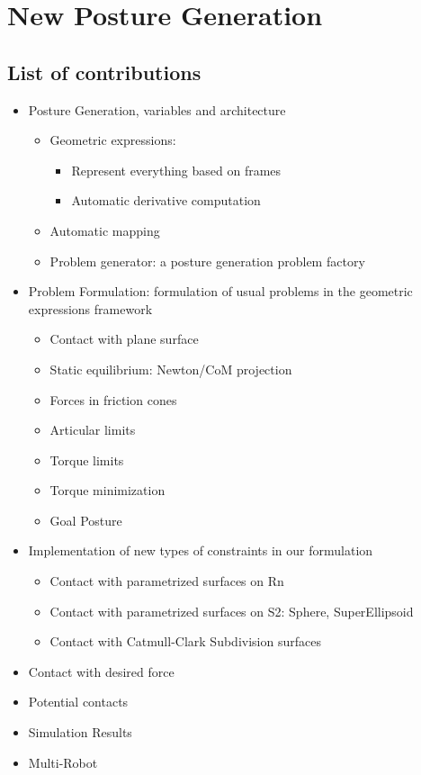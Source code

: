 

\chapter{
New Posture Generation
}

\section{List of contributions}
\begin{itemize}
  \item{Posture Generation, variables and architecture}
    \begin{itemize}
      \item Geometric expressions:
        \begin{itemize}
          \item Represent everything based on frames
          \item Automatic derivative computation
        \end{itemize}
      \item Automatic mapping
      \item Problem generator: a posture generation problem factory
    \end{itemize}
  \item{Problem Formulation: formulation of usual problems in the geometric expressions framework}
    \begin{itemize}
      \item Contact with plane surface
      \item Static equilibrium: Newton/CoM projection
      \item Forces in friction cones
      \item Articular limits
      \item Torque limits
      \item Torque minimization
      \item Goal Posture
    \end{itemize}
  \item{Implementation of new types of constraints in our formulation}
    \begin{itemize}
      \item Contact with parametrized surfaces on Rn
      \item Contact with parametrized surfaces on S2: Sphere, SuperEllipsoid
      \item Contact with Catmull-Clark Subdivision surfaces
    \end{itemize}
  \item{Contact with desired force}
  \item{Potential contacts}
  \item{Simulation Results}
  \item{Multi-Robot}
\end{itemize}
